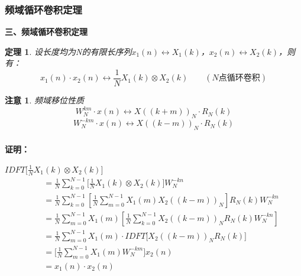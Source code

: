 \documentclass[notheorems,compress,mathserif,table]{beamer}
\newtheorem{theorem}{定理}
\newtheorem{zhuyi}{注意}
\begin{document}
\begin{frame}[shrink]\frametitle{频域循环卷积定理}%
\textbf{三、频域循环卷积定理}
\begin{theorem}
设长度均为N的有限长序列$x_1(n)\leftrightarrow X_1(k)$，$x_2(n)\leftrightarrow X_2(k)$，则有：
$$x_1(n)\cdot x_2(n)\longleftrightarrow\frac{1}{N}X_1(k)\otimes X_2(k)\quad\quad(\mbox{$N$点循环卷积})$$
\end{theorem}
\begin{zhuyi}
频域移位性质
$$W_N^{km}\cdot x(n) \longleftrightarrow X((k+m))_N\cdot R_N(k)$$
$$W_N^{-km}\cdot x(n) \longleftrightarrow X((k-m))_N\cdot R_N(k) $$
\end{zhuyi}

\end{frame}





\begin{frame}[shrink]\frametitle{}%
\textbf{证明：}

$IDFT\big[ \frac{1}{N}X_1(k) \otimes X_2(k)\big]$
\begin{equation*}
\begin{split}
    \quad
         &= \frac{1}{N}\sum_{k=0}^{N-1}\bigg[ \frac{1}{N}X_1(k) \otimes X_2(k) \bigg]W_N^{-kn} \\
         &= \frac{1}{N}\sum_{k=0}^{N-1}\left[\frac{1}{N}\sum_{m=0}^{N-1}X_1(m) X_2((k-m))_N \right] R_N(k) W_N^{-kn}   \\
         &= \frac{1}{N}\sum_{m=0}^{N-1}X_1(m)\left[ \frac{1}{N}\sum_{k=0}^{N-1} X_2((k-m))_N R_N(k) W_N^{-kn} \right]   \\
         &= \frac{1}{N}\sum_{m=0}^{N-1}X_1(m)\cdot IDFT\Big[  X_2((k-m))_N R_N(k) \Big]  \quad \\
         &= \Big[\frac{1}{N}\sum_{m=0}^{N-1} X_1(m)W_N^{-km}\Big] x_2(n) \\
         &= x_1(n)\cdot x_2(n)
\end{split}
\end{equation*}
\end{frame}
%
\end{document}
